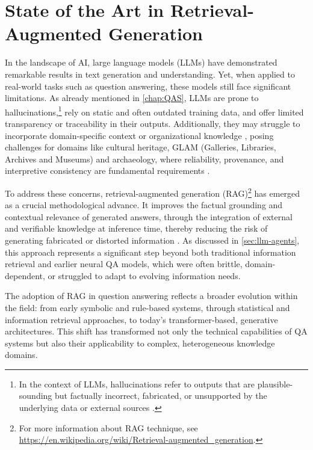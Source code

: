 \chapter{State of the Art in Retrieval-Augmented Generation}
\label{chap:sota}
\begin{spacing}{1.5}
\sloppy
In the landscape of AI, large language models (LLMs) have demonstrated remarkable results in text generation and understanding. Yet, when applied to real-world tasks such as question answering, these models still face significant limitations. As already mentioned in \autoref{chap:QAS}, LLMs are prone to hallucinations,\footnote{In the context of LLMs, hallucinations refer to outputs that are plausible-sounding but factually incorrect, fabricated, or unsupported by the underlying data or external sources \citep{harsh_comprehending_2024}.} rely on static and often outdated training data, and offer limited transparency or traceability in their outputs. Additionally, they may struggle to incorporate domain-specific context or organizational knowledge \citep{vaibhav_retrieval-augmented_2025}, posing challenges for domains like cultural heritage, GLAM (Galleries, Libraries, Archives and Museums) and archaeology, where reliability, provenance, and interpretive consistency are fundamental requirements \citep{di_marcantonio_intelligenza_2024}.

To address these concerns, retrieval-augmented generation (RAG)\footnote{For more information about RAG technique, see \url{https://en.wikipedia.org/wiki/Retrieval-augmented_generation}.} has emerged as a crucial methodological advance. It improves the factual grounding and contextual relevance of generated answers, through the integration of external and verifiable knowledge at inference time, thereby reducing the risk of generating fabricated or distorted information \citep{martineau_what_2023}. As discussed in \autoref{sec:llm-agents}, this approach represents a significant step beyond both traditional information retrieval and earlier neural QA models, which were often brittle, domain-dependent, or struggled to adapt to evolving information needs.

The adoption of RAG in question answering reflects a broader evolution within the field: from early symbolic and rule-based systems, through statistical and information retrieval approaches, to today’s transformer-based, generative architectures. This shift has transformed not only the technical capabilities of QA systems but also their applicability to complex, heterogeneous knowledge domains.


\end{spacing}
